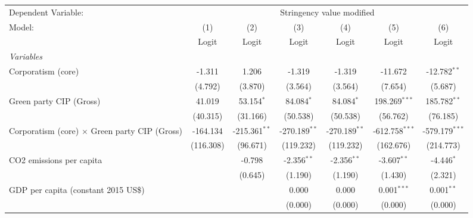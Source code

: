 
\begingroup
\centering
\begin{tabular}{lcccccc}
   \toprule
   Dependent Variable: & \multicolumn{6}{c}{Stringency value modified}\\
   Model:                                               & (1)       & (2)             & (3)             & (4)             & (5)              & (6)\\  
                                                        &  Logit    & Logit           & Logit           & Logit           & Logit            & Logit\\  
   \midrule
   \emph{Variables}\\
   Corporatism (core)                                   & -1.311    & 1.206           & -1.319          & -1.319          & -11.672          & -12.782$^{**}$\\   
                                                        & (4.792)   & (3.870)         & (3.564)         & (3.564)         & (7.654)          & (5.687)\\   
   Green party CIP (Gross)                              & 41.019    & 53.154$^{*}$    & 84.084$^{*}$    & 84.084$^{*}$    & 198.269$^{***}$  & 185.782$^{**}$\\   
                                                        & (40.315)  & (31.166)        & (50.538)        & (50.538)        & (56.762)         & (76.185)\\   
   Corporatism (core) $\times$ Green party CIP (Gross)  & -164.134  & -215.361$^{**}$ & -270.189$^{**}$ & -270.189$^{**}$ & -612.758$^{***}$ & -579.179$^{***}$\\   
                                                        & (116.308) & (96.671)        & (119.232)       & (119.232)       & (162.676)        & (214.773)\\   
   CO2 emissions per capita                             &           & -0.798          & -2.356$^{**}$   & -2.356$^{**}$   & -3.607$^{**}$    & -4.446$^{*}$\\   
                                                        &           & (0.645)         & (1.190)         & (1.190)         & (1.430)          & (2.321)\\   
   GDP per capita (constant 2015 US\$)                  &           &                 & 0.000           & 0.000           & 0.001$^{***}$    & 0.001$^{**}$\\   
                                                        &           &                 & (0.000)         & (0.000)         & (0.000)          & (0.000)\\   

\end{tabular}
